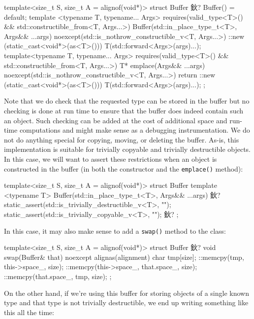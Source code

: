 \begin{code}
template<size_t S, size_t A = alignof(void*)>
struct Buffer {
  鈥?
  Buffer() = default;
  template <typename T, typename... Args>
    requires(valid_type<T>() &&
             std::constructible_from<T, Args...>)
  Buffer(std::in_place_type_t<T>, Args&& ...args)
    noexcept(std::is_nothrow_constructible_v<T, Args...>)
  {
    ::new (static_cast<void*>(as<T>()))
      T(std::forward<Args>(args)...);
  }
  template<typename T, typename... Args>
    requires(valid_type<T>() &&
             std::constructible_from<T, Args...>)
  T* emplace(Args&& ...args)
    noexcept(std::is_nothrow_constructible_v<T, Args...>)
  {
    return ::new (static_cast<void*>(as<T>()))
      T(std::forward<Args>(args)...);
  }
};
\end{code}

Note that we do check that the requested type can be stored in the buffer but no checking is done at run time to ensure that the buffer does indeed contain such an object. Such checking can be added at the cost of additional space and run-time computations and might make sense as a debugging instrumentation. We do not do anything special for copying, moving, or deleting the buffer. As-is, this implementation is suitable for trivially copyable and trivially destructible objects. In this case, we will want to assert these restrictions when an object is constructed in the buffer (in both the constructor and the \texttt{emplace()} method):

\begin{code}
template<size_t S, size_t A = alignof(void*)>
struct Buffer {
  template <typename T>
  Buffer(std::in_place_type_t<T>, Args&& ...args) 鈥?{
    static_assert(std::is_trivially_destructible_v<T>, "");
    static_assert(std::is_trivially_copyable_v<T>, "");
    鈥?
  }
};
\end{code}

In this case, it may also make sense to add a \texttt{swap()} method to the class:

\begin{code}
template<size_t S, size_t A = alignof(void*)>
struct Buffer {
  鈥?
  void swap(Buffer& that) noexcept {
    alignas(alignment) char tmp[size];
    ::memcpy(tmp, this->space_, size);
    ::memcpy(this->space_, that.space_, size);
    ::memcpy(that.space_, tmp, size);
  }
};
\end{code}

On the other hand, if we're using this buffer for storing objects of a single known type and that type is not trivially destructible, we end up writing something like this all the time:

